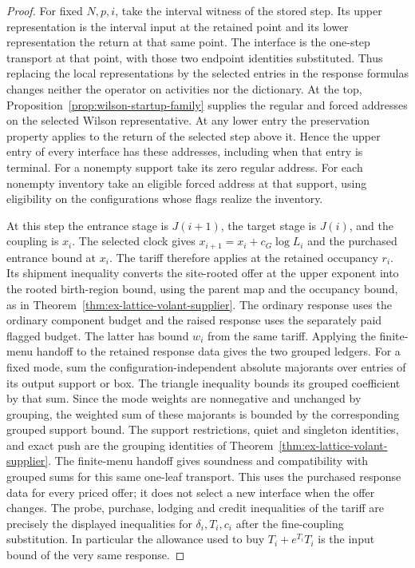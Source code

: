 \begin{proof}
For fixed $N,p,i$, take the interval witness of the stored step.
Its upper representation is the interval input at the retained point
and its lower representation the return at that same point. The interface
is the one-step transport at that point, with those two endpoint
identities substituted. Thus replacing the local representations by
the selected entries in the response formulas changes neither the
operator on activities nor the dictionary. At the top,
Proposition~\ref{prop:wilson-startup-family} supplies the regular and
forced addresses on the selected Wilson representative. At any
lower entry the preservation property applies to the return of the
selected step above it. Hence the upper entry of every interface has these
addresses, including when that entry is terminal. For a nonempty
support take its zero regular address. For each nonempty inventory
take an eligible forced address at that support, using eligibility
on the configurations whose flags realize the inventory.

At this step the entrance stage is $J(i+1)$, the target stage is
$J(i)$, and the coupling is $x_i$. The selected clock gives
$x_{i+1}=x_i+c_G\log L_i$ and the purchased entrance bound at $x_i$.
The tariff therefore applies at the retained occupancy $r_i$.
Its shipment inequality converts the site-rooted offer at the upper
exponent into the rooted birth-region bound, using the parent map
and the occupancy bound, as in
Theorem~\ref{thm:ex-lattice-volant-supplier}. The ordinary response uses
the ordinary component budget and the raised response uses the
separately paid flagged budget. The latter has bound $w_i$ from the
same tariff. Applying the finite-menu handoff to the retained
response data gives the two grouped ledgers. For a fixed mode, sum the
configuration-independent absolute majorants over entries of its output
support or box. The triangle inequality bounds its grouped coefficient
by that sum. Since the mode weights are nonnegative and unchanged by
grouping, the weighted sum of these majorants is bounded by the
corresponding grouped support bound. The support restrictions,
quiet and singleton identities, and exact push are the grouping
identities of Theorem~\ref{thm:ex-lattice-volant-supplier}. The finite-menu
handoff gives soundness and compatibility with grouped sums for this
same one-leaf transport. This uses the purchased response data for
every priced offer; it does not select a new interface when the offer changes.
The probe, purchase, lodging and credit inequalities of the tariff
are precisely the displayed inequalities for $\delta_i,T_i,c_i$
after the fine-coupling substitution. In particular the allowance used
to buy $T_i+e^{T_i}T_i$ is the input bound of the very same response.


\end{proof}
